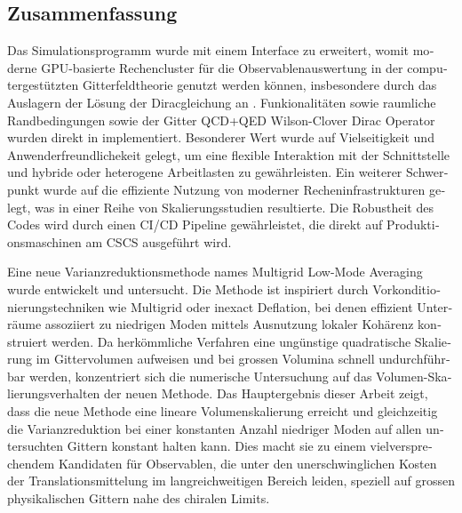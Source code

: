 \begin{otherlanguage}{ngerman}
\chapter*{Zusammenfassung}

Das Simulationsprogramm \openqxd wurde mit einem Interface zu \quda erweitert, womit moderne GPU-basierte Rechencluster für die Observablenauswertung in der computergestützten Gitterfeldtheorie genutzt werden können, insbesondere durch das Auslagern der Lösung der Diracgleichung an \quda.
Funkionalitäten sowie raumliche \Cstar Randbedingungen sowie der Gitter QCD+QED Wilson-Clover Dirac Operator wurden direkt in \quda implementiert.
Besonderer Wert wurde auf Vielseitigkeit und Anwenderfreundlichekeit gelegt, um eine flexible Interaktion mit der Schnittstelle und hybride oder heterogene Arbeitlasten zu gewährleisten.
Ein weiterer Schwerpunkt wurde auf die effiziente Nutzung von moderner Recheninfrastrukturen gelegt, was in einer Reihe von Skalierungsstudien resultierte.
Die Robustheit des Codes wird durch einen CI/CD Pipeline gewährleistet, die direkt auf Produktionsmaschinen am CSCS ausgeführt wird.

Eine neue Varianzreduktionsmethode names Multigrid Low-Mode Averaging wurde entwickelt und untersucht.
Die Methode ist inspiriert durch Vorkonditionierungstechniken wie Multigrid oder inexact Deflation, bei denen effizient Unterräume assoziiert zu niedrigen Moden mittels Ausnutzung lokaler Kohärenz konstruiert werden.
Da herkömmliche Verfahren eine ungünstige quadratische Skalierung im Gittervolumen aufweisen und bei grossen Volumina schnell undurchführbar werden, konzentriert sich die numerische Untersuchung auf das Volumen-Skalierungsverhalten der neuen Methode.
Das Hauptergebnis dieser Arbeit zeigt, dass die neue Methode eine lineare Volumenskalierung erreicht und gleichzeitig die Varianzreduktion bei einer konstanten Anzahl niedriger Moden auf allen untersuchten Gittern konstant halten kann.
Dies macht sie zu einem vielversprechendem Kandidaten für Observablen,
die unter den unerschwinglichen Kosten der Translationsmittelung im langreichweitigen Bereich leiden,
speziell auf grossen physikalischen Gittern nahe des chiralen Limits.

\end{otherlanguage}

\endgroup

\vfill